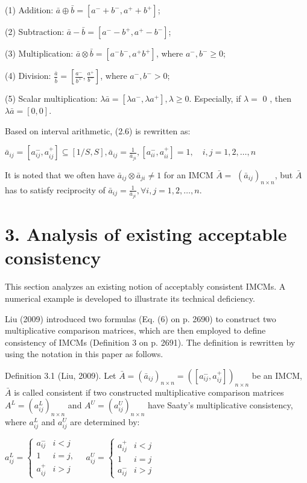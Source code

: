 \documentclass[10pt]{article}
\begin{document}
(1) Addition: $\bar{a} \oplus \bar{b}=\left[a^{-}+b^{-}, a^{+}+b^{+}\right]$;

(2) Subtraction: $\bar{a}-\bar{b}=\left[a^{-}-b^{+}, a^{+}-b^{-}\right]$;

(3) Multiplication: $\bar{a} \otimes \bar{b}=\left[a^{-} b^{-}, a^{+} b^{+}\right]$, where $a^{-}, b^{-} \geq 0$;

(4) Division: $\frac{\bar{a}}{\bar{b}}=\left[\frac{a^{-}}{b^{+}}, \frac{a^{+}}{b^{-}}\right]$, where $a^{-}, b^{-}>0$;

(5) Scalar multiplication: $\lambda \bar{a}=\left[\lambda a^{-}, \lambda a^{+}\right], \lambda \geq 0$. Especially, if $\lambda=$ 0 , then $\lambda \bar{a}=[0,0]$.

Based on interval arithmetic, (2.6) is rewritten as:

$\bar{a}_{i j}=\left[a_{i j}^{-}, a_{i j}^{+}\right] \subseteq[1 / S, S], \bar{a}_{i j}=\frac{1}{\bar{a}_{j i}},\left[a_{i i}^{-}, a_{i i}^{+}\right]=1, \quad i, j=1,2, \ldots, n$

It is noted that we often have $\bar{a}_{i j} \otimes \bar{a}_{j i} \neq 1$ for an IMCM $\bar{A}=$ $\left(\bar{a}_{i j}\right)_{n \times n}$, but $\bar{A}$ has to satisfy reciprocity of $\bar{a}_{i j}=\frac{1}{\bar{a}_{j i}}, \forall i, j=1,2, \ldots, n$.

\section*{3. Analysis of existing acceptable consistency}
This section analyzes an existing notion of acceptably consistent IMCMs. A numerical example is developed to illustrate its technical deficiency.

Liu (2009) introduced two formulas (Eq. (6) on p. 2690) to construct two multiplicative comparison matrices, which are then employed to define consistency of IMCMs (Definition 3 on p. 2691). The definition is rewritten by using the notation in this paper as follows.

Definition 3.1 (Liu, 2009). Let $\bar{A}=\left(\bar{a}_{i j}\right)_{n \times n}=\left(\left[a_{i j}^{-}, a_{i j}^{+}\right]\right)_{n \times n}$ be an IMCM, $\bar{A}$ is called consistent if two constructed multiplicative comparison matrices $A^{L}=\left(a_{i j}^{L}\right)_{n \times n}$ and $A^{U}=\left(a_{i j}^{U}\right)_{n \times n}$ have Saaty's multiplicative consistency, where $a_{i j}^{L}$ and $a_{i j}^{U}$ are determined by:

$a_{i j}^{L}=\left\{\begin{array}{ll}a_{i j}^{-} & i<j \\ 1 & i=j, \\ a_{i j}^{+} & i>j\end{array} \quad a_{i j}^{U}= \begin{cases}a_{i j}^{+} & i<j \\ 1 & i=j \\ a_{i j}^{-} & i>j\end{cases}\right.$
\end{document}
